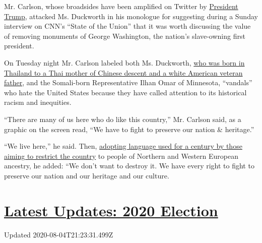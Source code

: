 Mr. Carlson, whose broadsides have been amplified on Twitter by
\href{https://www.nytimes3xbfgragh.onion/interactive/2020/us/elections/donald-trump.html}{President
Trump}, attacked Ms. Duckworth in his monologue for suggesting during a
Sunday interview on CNN's ``State of the Union'' that it was worth
discussing the value of removing monuments of George Washington, the
nation's slave-owning first president.

On Tuesday night Mr. Carlson labeled both Ms. Duckworth,
\href{https://www.nytimes3xbfgragh.onion/2020/06/25/us/politics/tammy-duckworth-vice-president-joe-biden.html}{who
was born in Thailand to a Thai mother of Chinese descent and a white
American veteran father}, and the Somali-born Representative Ilhan Omar
of Minnesota, ``vandals'' who hate the United States because they have
called attention to its historical racism and inequities.

``There are many of us here who do like this country,'' Mr. Carlson
said, as a graphic on the screen read, ``We have to fight to preserve
our nation \& heritage.''

``We live here,'' he said. Then,
\href{https://www.nytimes3xbfgragh.onion/2020/04/10/sunday-review/coronavirus-asian-racism.html}{adopting
language used for a century by those aiming to restrict the country} to
people of Northern and Western European ancestry, he added: ``We don't
want to destroy it. We have every right to fight to preserve our nation
and our heritage and our culture.

\hypertarget{latest-updates-2020-election}{%
\section{\texorpdfstring{\href{https://www.nytimes3xbfgragh.onion/2020/08/04/us/elections/primary-election-michigan-arizona-kansas.html?action=click\&pgtype=Article\&state=default\&region=MAIN_CONTENT_1\&context=storylines_live_updates}{Latest
Updates: 2020
Election}}{Latest Updates: 2020 Election}}\label{latest-updates-2020-election}}

Updated 2020-08-04T21:23:31.499Z

